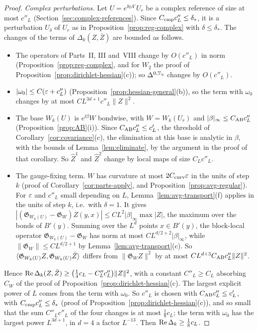 \begin{proof}
\emph{Complex perturbations.} Let $U=e^{\ii\eta A'}U_r$ be a complex reference of size at most $c''_L$ (Section~\ref{sec:complex-references}). Since $C_{\rm cmp}c''_L\le\delta_*$, it is a perturbation $U_\delta$ of $U_r$ as in Proposition~\ref{prop:reg-complex} with $\delta\le\delta_*$. The changes of the terms of $\Delta_k(Z,\bar Z)$ are bounded as follows.
\begin{itemize}
\item The operators of Parts~II, III and~VIII change by $O(c''_L)$ in norm (Proposition~\ref{prop:reg-complex}, and for $W_2$ the proof of Proposition~\ref{prop:dirichlet-hessian}(c)); so $\Delta^{0,\mathbb T_\eta}$ changes by $O(c''_L)$.
\item $|\omega_0|\le C(\varepsilon+c''_L)$ (Proposition~\ref{prop:hessian-general}(b)), so the term with $\omega_0$ changes by at most $CL^{3d+1}c''_L\|Z\|^2$.
\item The base $W_k(U)$ is $e^{\ii\beta}W$ bondwise, with $W=W_k(U_r)$ and $|\beta|_\infty\le C_{\rm AB}c''_L$ (Proposition~\ref{prop:AB}(i)). Since $C_{\rm AB}c''_L\le c'_L$, the threshold of Corollary~\ref{cor:covariance}(c), the elimination at this base is analytic in $\beta$, with the bounds of Lemma~\ref{lem:eliminate}, by the argument in the proof of that corollary. So $\hat Z^1$ and $\hat Z^2$ change by local maps of size $C_Lc''_L$.
\item The gauge-fixing term. $W$ has curvature at most $2C_{\rm curv}\varepsilon$ in the units of step $k$ (proof of Corollary~\ref{cor:parts-apply}, and Proposition~\ref{prop:avg-regular}). For $\varepsilon$ and $c''_L$ small depending on $L$, Lemma~\ref{lem:avg-transport}(f) applies in the units of step $k$, i.e.\ with $\delta=1$. It gives $|(\mathfrak G_{W_k(U)}-\mathfrak G_W)Z(y,x)|\le CL^2|\beta|_\infty\max|Z|$, the maximum over the bonds of $B'(y)$. Summing over the $L^d$ points $x\in B'(y)$, the block-local operator $\mathfrak G_{W_k(U)}-\mathfrak G_W$ has norm at most $CL^{d/2+2}|\beta|_\infty$, while $\|\mathfrak G_W\|\le CL^{d/2+1}$ by Lemma~\ref{lem:avg-transport}(c). So $\langle \mathfrak G_{W_k(U)}Z,\mathfrak G_{W_k(U)}\bar Z\rangle$ differs from $\|\mathfrak G_WZ\|^2$ by at most $CL^{d+3}C_{\rm AB}c''_L\|Z\|^2$.
\end{itemize}
Hence $\operatorname{Re}\Delta_k(Z,\bar Z)\ge\big(\frac14c_L-C''_Lc''_L\big)\|Z\|^2$, with a constant $C''_L\ge C_L$ absorbing $C_W$ of the proof of Proposition~\ref{prop:dirichlet-hessian}(c). The largest explicit power of $L$ comes from the term with $\omega_0$. So $c''_L$ is chosen with $C_{\rm AB}c''_L\le c'_L$, with $C_{\rm cmp}c''_L\le\delta_*$ (proof of Proposition~\ref{prop:dirichlet-hessian}(c)), and so small that the sum $C''_Lc''_L$ of the four changes is at most $\frac18c_L$; the term with $\omega_0$ has the largest power $L^{3d+1}$, in $d=4$ a factor $L^{-13}$. Then $\operatorname{Re}\Delta_k\ge\frac18c_L$.
\end{proof}

